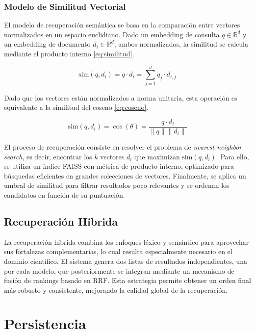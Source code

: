 \documentclass[runningheads]{llncs}
\begin{document}
\subsubsection{Modelo de Similitud Vectorial}

El modelo de recuperación semántica se basa en la comparación entre vectores normalizados en un espacio euclidiano. 
Dado un embedding de consulta $q \in \mathbb{R}^d$ y un embedding de documento $d_i \in \mathbb{R}^d$, 
ambos normalizados, la similitud se calcula mediante el producto interno \eqref{eq:similitud}.

\begin{equation}
    \text{sim}(q, d_i) = q \cdot d_i = \sum_{j=1}^{d} q_j \cdot d_{i,j}
    \label{eq:similitud}
\end{equation}

Dado que los vectores están normalizados a norma unitaria, esta operación es equivalente a la similitud 
del coseno \eqref{eq:coseno}.

\begin{equation}
    \text{sim}(q, d_i) = \cos(\theta) = \frac{q \cdot d_i}{\|q\| \|d_i\|}
    \label{eq:coseno}
\end{equation}

El proceso de recuperación consiste en resolver el problema de \textit{nearest neighbor search}, 
es decir, encontrar los $k$ vectores $d_i$ que maximizan $\text{sim}(q, d_i)$. 
Para ello, se utiliza un índice FAISS con métrica de producto interno, 
optimizado para búsquedas eficientes en grandes colecciones de vectores. 
Finalmente, se aplica un umbral de similitud para filtrar resultados poco relevantes y 
se ordenan los candidatos en función de su puntuación.

\subsection{Recuperación Híbrida}

La recuperación híbrida combina los enfoques léxico y semántico para aprovechar sus fortalezas complementarias, 
lo cual resulta especialmente necesario en el dominio científico. 
El sistema genera dos listas de resultados independientes, una por cada modelo, 
que posteriormente se integran mediante un mecanismo de fusión de rankings basado en RRF. 
Esta estrategia permite obtener un orden final más robusto y consistente, mejorando la calidad global de la recuperación.

\section{Persistencia}
\end{document}
